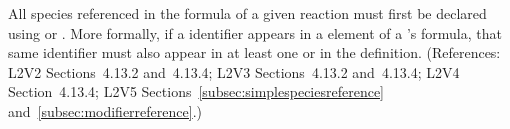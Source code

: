 All species referenced in the \StoichiometryMath formula of a given
reaction must first be declared using \SpeciesReference or
\ModifierSpeciesReference.  More formally, if a \Species identifier appears
in a  element of a \Reaction's \StoichiometryMath formula, that
same identifier must also appear in at least one \SpeciesReference or
\ModifierSpeciesReference in the \Reaction definition.  (References: L2V2
Sections~4.13.2 and~4.13.4; L2V3 Sections~4.13.2 and~4.13.4; L2V4 Section~4.13.4; L2V5 Sections~\ref{subsec:simplespeciesreference}
and~\ref{subsec:modifierreference}.)
